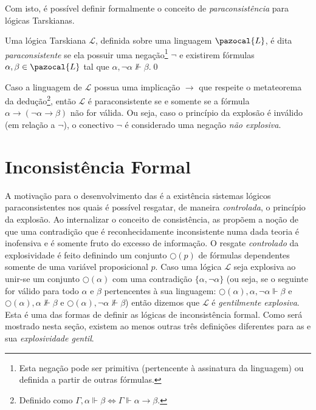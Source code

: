     Com isto, é possível definir formalmente o conceito de \textit{paraconsistência} para lógicas Tarskianas.

    \begin{definicao}\label{def:tarskiana_paracons}
        Uma lógica Tarskiana $\mathcal{L}$, definida sobre uma linguagem $\pazocal{L}$, é dita \textit{paraconsistente} se ela possuir uma negação\footnote{Esta negação pode ser primitiva (pertencente à assinatura da linguagem) ou definida a partir de outras fórmulas.} $\neg$ e existirem fórmulas $\alpha, \beta \in \pazocal{L}$ tal que $\alpha, \neg \alpha \nVdash \beta$.\qed{}
    \end{definicao}

    Caso a linguagem de $\mathcal{L}$ possua uma implicação $\to$ que respeite o metateorema da dedução\footnote{Definido como $\Gamma, \alpha \Vdash \beta \Longleftrightarrow  \Gamma\Vdash \alpha \to \beta$.}, então $\mathcal{L}$ é paraconsistente se e somente se a fórmula $\alpha \to (\neg \alpha \to \beta)$ não for válida. Ou seja, caso o princípio da explosão é inválido (em relação a $\neg$), o conectivo $\neg$ é considerado uma negação \textit{não explosiva}.

\section{Inconsistência Formal}\label{sec:incons}
    A motivação para o desenvolvimento das \lfis{} é a existência sistemas lógicos paraconsistentes nos quais é possível resgatar, de maneira \textit{controlada}, o princípio da explosão. Ao internalizar o conceito de consistência, as \lfis{} propõem a noção de que uma contradição que é reconhecidamente inconsistente numa dada teoria é inofensiva e é somente fruto do excesso de informação. O resgate \textit{controlado} da explosividade é feito definindo um conjunto $\bigcirc(p)$ de fórmulas dependentes somente de uma variável proposicional $p$. Caso uma lógica $\mathcal{L}$ seja explosiva ao unir-se um conjunto $\bigcirc(\alpha)$ com uma contradição $\{\alpha, \neg \alpha\}$ (ou seja, se  o seguinte for válido para todo $\alpha$ e $\beta$ pertencentes à sua linguagem: $\bigcirc(\alpha), \alpha, \neg \alpha \Vdash \beta$ e $\bigcirc(\alpha), \alpha \nVdash \beta$ e $\bigcirc(\alpha), \neg \alpha \nVdash \beta$) então dizemos que $\mathcal{L}$ é \textit{gentilmente explosiva}. Esta é uma das formas de definir as lógicas de inconsistência formal. Como será mostrado nesta seção, existem ao menos outras três definições diferentes para as \lfis{} e sua \textit{explosividade gentil}.

